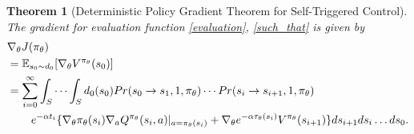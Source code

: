 \documentclass[english, dvipdfmx]{ampmt}             %
\newcommand{\expect}{\mathbb{E}}
\newtheorem{th.}{Theorem}
\begin{document}
\begin{th.}[Deterministic Policy Gradient Theorem for Self-Triggered Control]
\label{main_theorem}
The gradient for evaluation function \eqref{evaluation}, \eqref{such_that} is given by
\begin{align}
	&\nabla_{\theta}J(\pi_{\theta})\nonumber \\
	&= \expect_{s_0\sim d_0}[\nabla_{\theta}V^{\pi_{\theta}}(s_0)]\nonumber\\
	&= \sum_{i=0}^{\infty}\int_{S}\cdots\int_{S}d_0(s_0)Pr(s_0\to s_1,1,\pi_{\theta})\cdots Pr(s_{i}\to s_{i+1},1,\pi_{\theta})\nonumber\\
	&\hspace{5ex}e^{-\alpha t_i}\{\nabla_{\theta}\pi_{\theta}(s_i)\nabla_aQ^{\pi_{\theta}}(s_i,a)|_{a=\pi_{\theta}(s_i)} + \nabla_{\theta}e^{-\alpha\tau_{\theta}(s_{i})}V^{\pi_{\theta}}(s_{i+1})\}ds_{i+1}ds_{i}\ldots ds_0. \label{PG_for_STC}
\end{align}
\end{th.}
\end{document}
